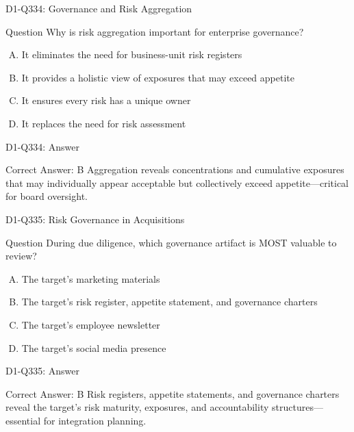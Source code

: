 \documentclass{beamer}
\begin{document}
\begin{frame}{D1-Q334: Governance and Risk Aggregation}
	\begin{block}{Question}
		Why is risk aggregation important for enterprise governance?
	\end{block}
	\begin{enumerate}[(A)]
		\item It eliminates the need for business-unit risk registers
		\item It provides a holistic view of exposures that may exceed appetite
		\item It ensures every risk has a unique owner
		\item It replaces the need for risk assessment
	\end{enumerate}
\end{frame}
\begin{frame}{D1-Q334: Answer}
	\begin{block}{Correct Answer: B}
		Aggregation reveals concentrations and cumulative exposures that may individually appear acceptable but collectively exceed appetite—critical for board oversight.
	\end{block}
\end{frame}

\begin{frame}{D1-Q335: Risk Governance in Acquisitions}
	\begin{block}{Question}
		During due diligence, which governance artifact is MOST valuable to review?
	\end{block}
	\begin{enumerate}[(A)]
		\item The target's marketing materials
		\item The target's risk register, appetite statement, and governance charters
		\item The target's employee newsletter
		\item The target's social media presence
	\end{enumerate}
\end{frame}
\begin{frame}{D1-Q335: Answer}
	\begin{block}{Correct Answer: B}
		Risk registers, appetite statements, and governance charters reveal the target's risk maturity, exposures, and accountability structures—essential for integration planning.
	\end{block}
\end{frame}
\end{document}
